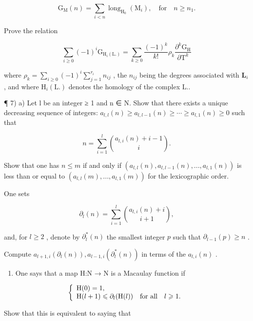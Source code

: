 \[
\mathrm{G} _ {\mathrm{M}} (n) = \sum_ {i <   n} \operatorname{long} _ {\mathrm{H} _ {0}} (\mathrm{M} _ {i}), \quad \text {for} \quad n \geqslant n _ {1}.
\]

Prove the relation

\[
\sum_ {i \geqslant 0} (- 1) ^ {i} \mathrm{G} _ {\mathrm{H} _ {i} (\mathrm{L.})} = \sum_ {k \geqslant 0} \frac {(- 1) ^ {k}}{k !} \rho_ {k} \frac {\partial^ {k} \mathrm{G} _ {\mathrm{H}}}{\partial \mathrm{T} ^ {k}}
\]

where \(\rho_{k} = \sum_{i\geqslant 0}(-1)^{i}\sum_{j = 1}^{r_{i}}n_{ij}\) , the \(n_{ij}\) being the degrees associated with \(\mathbf{L}_i\) , and where \(\mathrm{H}_i(\mathrm{L.})\) denotes the homology of the complex \(\mathrm{L.}\).

¶ 7) a) Let l be an integer ≥ 1 and n ∈ N. Show that there exists a unique decreasing sequence of integers: \(a_{l,l}(n) \geqslant a_{l,l-1}(n) \geqslant \cdots \geqslant a_{l,1}(n) \geqslant 0\) such that

\[
n = \sum_ {i = 1} ^ {l} \binom {a _ {l, i} (n) + i - 1} {i}.
\]

Show that one has \(n \leqslant m\) if and only if \((a_{l,l}(n), a_{l,l-1}(n), ..., a_{l,1}(n))\) is less than or equal to \((a_{l,l}(m), ..., a_{l,1}(m))\) for the lexicographic order.

One sets

\[
\partial_ {l} (n) = \sum_ {i = 1} ^ {l} \binom {a _ {l, i} (n) + i} {i + 1},
\]

and, for \(l \geqslant 2\) , denote by \(\partial_l^*(n)\) the smallest integer \(p\) such that \(\partial_{l-1}(p) \geqslant n\) .

Compute \(a_{l+1,i}(\partial_l(n)), a_{l-1,i}(\partial_l^*(n))\) in terms of the \(a_{l,i}(n)\) .

\begin{enumerate}
\def\labelenumi{\alph{enumi})}
\setcounter{enumi}{1}
\tightlist
\item
  One says that a map H:N → N is a Macaulay function if
\end{enumerate}

\[
\left\{ \begin{array}{l l} \mathrm{H} (0) = 1, \\ \mathrm{H} (l + 1) \leqslant \partial_ {l} (\mathrm{H} (l)) & \text {for all} \quad l \geqslant 1. \end{array} \right.
\]

Show that this is equivalent to saying that

